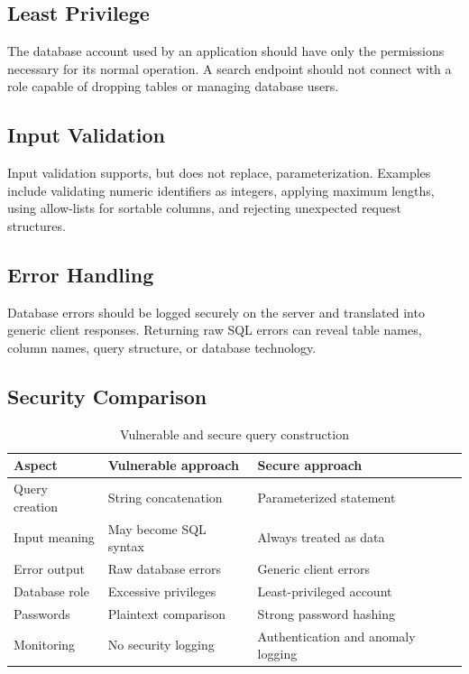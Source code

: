 \documentclass[12pt,a4paper]{article}
\begin{document}
\subsection{Least Privilege}

The database account used by an application should have only the permissions necessary for its normal operation. A search endpoint should not connect with a role capable of dropping tables or managing database users.

\subsection{Input Validation}

Input validation supports, but does not replace, parameterization. Examples include validating numeric identifiers as integers, applying maximum lengths, using allow-lists for sortable columns, and rejecting unexpected request structures.

\subsection{Error Handling}

Database errors should be logged securely on the server and translated into generic client responses. Returning raw SQL errors can reveal table names, column names, query structure, or database technology.

\subsection{Security Comparison}

\begin{table}[H]
\centering
\caption{Vulnerable and secure query construction}
\label{tab:vulnerable-secure}
\begin{tabularx}{\textwidth}{p{3cm}X X}
\toprule
Aspect & Vulnerable approach & Secure approach \\
\midrule
Query creation & String concatenation & Parameterized statement \\
Input meaning & May become SQL syntax & Always treated as data \\
Error output & Raw database errors & Generic client errors \\
Database role & Excessive privileges & Least-privileged account \\
Passwords & Plaintext comparison & Strong password hashing \\
Monitoring & No security logging & Authentication and anomaly logging \\
\bottomrule
\end{tabularx}
\end{table}
\end{document}
